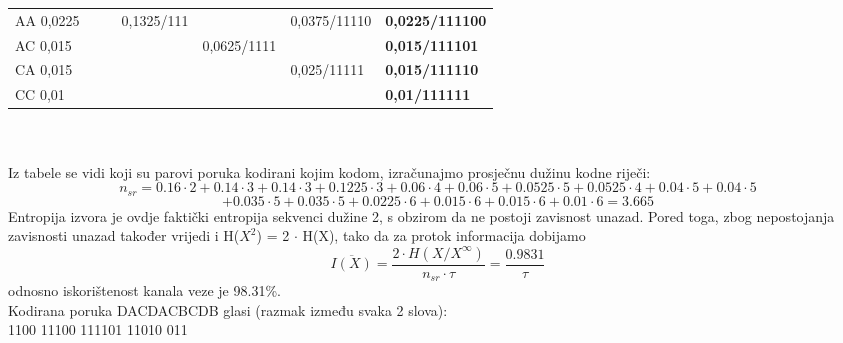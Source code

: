 \documentclass[12pt]{article}
\begin{document}
\begin{enumerate}
\begin{tabular}{|l|l|l|llll}
AA 0,0225 &        &                  & \multicolumn{1}{l|}{0,1325/111}          & \multicolumn{1}{l|}{}                     & \multicolumn{1}{l|}{0,0375/11110}          & \multicolumn{1}{l|}{\textbf{0,0225/111100}} \\ \cline{1-1} \cline{7-7} 
AC 0,015  &        &                  & \multicolumn{1}{l|}{}                    & \multicolumn{1}{l|}{0,0625/1111}          & \multicolumn{1}{l|}{}                      & \multicolumn{1}{l|}{\textbf{0,015/111101}}  \\ \cline{1-1} \cline{6-7} 
CA 0,015  &        &                  & \multicolumn{1}{l|}{}                    & \multicolumn{1}{l|}{}                     & \multicolumn{1}{l|}{0,025/11111}           & \multicolumn{1}{l|}{\textbf{0,015/111110}}  \\ \cline{1-1} \cline{7-7} 
CC 0,01   &        &                  & \multicolumn{1}{l|}{}                    & \multicolumn{1}{l|}{}                     & \multicolumn{1}{l|}{}                      & \multicolumn{1}{l|}{\textbf{0,01/111111}}   \\ \hline
\end{tabular}
\\
\\
Iz tabele se vidi koji su parovi poruka kodirani kojim kodom, izračunajmo
prosječnu dužinu kodne riječi:
\begin{equation*}
    n_{sr} = 0.16 \cdot 2 + 0.14 \cdot 3 + 0.14 \cdot 3 + 0.1225 \cdot 3 + 0.06 \cdot 4 +
    0.06 \cdot 5 + 0.0525 \cdot 5 + 0.0525 \cdot 4 + 0.04 \cdot 5 + 0.04 \cdot 5
\end{equation*}
\begin{equation*}
    + 0.035 \cdot 5 + 0.035 \cdot 5 + 0.0225 \cdot 6 + 0.015 \cdot 6 + 0.015 \cdot 6 + 0.01 \cdot 6 = 3.665
\end{equation*}
Entropija izvora je ovdje faktički entropija sekvenci dužine 2, s obzirom
da ne postoji zavisnost unazad. Pored toga, zbog nepostojanja zavisnosti unazad također vrijedi i H($X^2$) = 2 ${\cdot}$ H(X), tako da za protok
informacija dobijamo
\begin{equation*}
    \overline{I(X)} = \frac{2 \cdot H(X/X^\infty)}{n_{sr} \cdot \tau} = \frac{0.9831}{\tau}
\end{equation*}
odnosno iskorištenost kanala veze je 98.31\%. \\
Kodirana poruka DACDACBCDB glasi (razmak između svaka 2 slova): \\
1100 11100 111101 11010 011
\\
\\

\end{enumerate}
\end{document}
